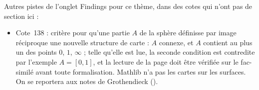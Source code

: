 \bigskip
\noindent Autres pistes de l'onglet Findings pour ce thème, dans des cotes qui n'ont pas de section ici :\par
\begin{itemize}\small\setlength{\itemsep}{0pt}
\item Cote~138 : critère pour qu'une partie $A$ de la sphère définisse par image réciproque une nouvelle structure de carte : $A$ connexe, et $A$ contient au plus un des points $0$, $1$, $\infty$ ; telle qu'elle est lue, la seconde condition est contredite par l'exemple $A = [0, 1]$, et la lecture de la page doit être vérifiée sur le fac-similé avant toute formalisation. Mathlib n'a pas les cartes sur les surfaces. On se reportera aux notes de Grothendieck ().
\end{itemize}

